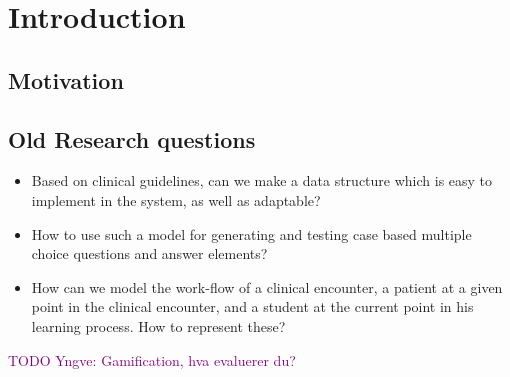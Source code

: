 \chapter{Introduction}
\section{Motivation}
\section{Old Research questions}
\begin{itemize}
	\item Based on clinical guidelines, can we make a data structure which is easy to implement in the system, as well as adaptable? 
	
	\item How to use such a model for generating and testing case based multiple choice questions and answer elements?
	
	
	\item How can we model the work-flow of a clinical encounter, a patient at a given point in the clinical encounter, and a student at the current point in his learning process. How to represent these?	
\end{itemize}
\textcolor{purple}{TODO Yngve: Gamification, hva evaluerer du?}
